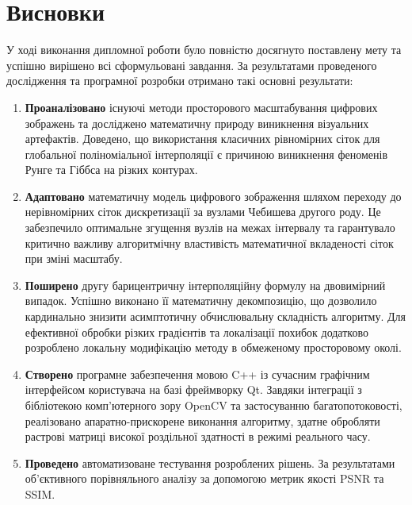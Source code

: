 \section*{Висновки}
У ході виконання дипломної роботи було повністю досягнуто поставлену мету та успішно вирішено всі сформульовані завдання. За результатами проведеного дослідження та програмної розробки отримано такі основні результати:

\begin{enumerate}
	\item \textbf{Проаналізовано} існуючі методи просторового масштабування цифрових зображень та досліджено математичну природу виникнення візуальних артефактів. Доведено, що використання класичних рівномірних сіток для глобальної поліноміальної інтерполяції є причиною виникнення феноменів Рунге та Гіббса на різких контурах.
	\item \textbf{Адаптовано} математичну модель цифрового зображення шляхом переходу до нерівномірних сіток дискретизації за вузлами Чебишева другого роду. Це забезпечило оптимальне згущення вузлів на межах інтервалу та гарантувало критично важливу алгоритмічну властивість математичної вкладеності сіток при зміні масштабу.
	\item \textbf{Поширено} другу барицентричну інтерполяційну формулу на двовимірний випадок. Успішно виконано її математичну декомпозицію, що дозволило кардинально знизити асимптотичну обчислювальну складність алгоритму. Для ефективної обробки різких градієнтів та локалізації похибок додатково розроблено локальну модифікацію методу в обмеженому просторовому околі.
	\item \textbf{Створено} програмне забезпечення мовою C++ із сучасним графічним інтерфейсом користувача на базі фреймворку Qt. Завдяки інтеграції з бібліотекою комп'ютерного зору OpenCV та застосуванню багатопотоковості, реалізовано апаратно-прискорене виконання алгоритму, здатне обробляти растрові матриці високої роздільної здатності в режимі реального часу.
	\item \textbf{Проведено} автоматизоване тестування розроблених рішень. За результатами об'єктивного порівняльного аналізу за допомогою метрик якості PSNR та SSIM.
\end{enumerate}

